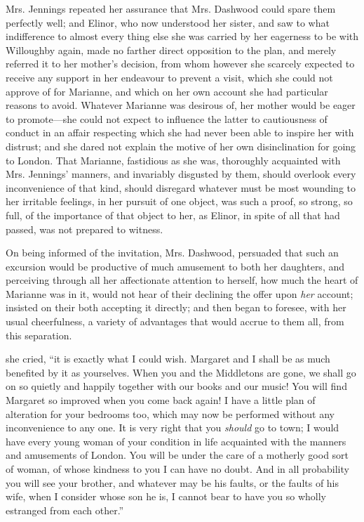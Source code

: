 Mrs. Jennings repeated her assurance that Mrs. Dashwood could spare them perfectly well; and Elinor, who now understood her sister, and saw to what indifference to almost every thing else she was carried by her eagerness to be with Willoughby again, made no farther direct opposition to the plan, and merely referred it to her mother's decision, from whom however she scarcely expected to receive any support in her endeavour to prevent a visit, which she could not approve of for Marianne, and which on her own account she had particular reasons to avoid. Whatever Marianne was desirous of, her mother would be eager to promote---she could not expect to influence the latter to cautiousness of conduct in an affair respecting which she had never been able to inspire her with distrust; and she dared not explain the motive of her own disinclination for going to London. That Marianne, fastidious as she was, thoroughly acquainted with Mrs. Jennings' manners, and invariably disgusted by them, should overlook every inconvenience of that kind, should disregard whatever must be most wounding to her irritable feelings, in her pursuit of one object, was such a proof, so strong, so full, of the importance of that object to her, as Elinor, in spite of all that had passed, was not prepared to witness.

On being informed of the invitation, Mrs. Dashwood, persuaded that such an excursion would be productive of much amusement to both her daughters, and perceiving through all her affectionate attention to herself, how much the heart of Marianne was in it, would not hear of their declining the offer upon {\em her} account; insisted on their both accepting it directly; and then began to foresee, with her usual cheerfulness, a variety of advantages that would accrue to them all, from this separation.

 she cried, “it is exactly what I could wish. Margaret and I shall be as much benefited by it as yourselves. When you and the Middletons are gone, we shall go on so quietly and happily together with our books and our music! You will find Margaret so improved when you come back again! I have a little plan of alteration for your bedrooms too, which may now be performed without any inconvenience to any one. It is very right that you {\em should} go to town; I would have every young woman of your condition in life acquainted with the manners and amusements of London. You will be under the care of a motherly good sort of woman, of whose kindness to you I can have no doubt. And in all probability you will see your brother, and whatever may be his faults, or the faults of his wife, when I consider whose son he is, I cannot bear to have you so wholly estranged from each other.”

